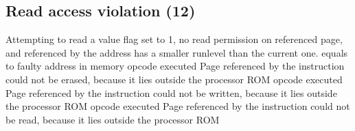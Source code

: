 \subsection{Read access violation (12)}
           {Attempting to read a value}
           { flag set to 1, no read permission on referenced page, and referenced by the address has a smaller runlevel than the current one.}
           { equals to faulty address in memory}
           { opcode executed}
           {Page referenced by the instruction could not be erased, because it lies outside the processor ROM}
           {}
           { opcode executed}
           {Page referenced by the instruction could not be written, because it lies outside the processor ROM}
           {}
           { opcode executed}
           {Page referenced by the instruction could not be read, because it lies outside the processor ROM}
           {}


